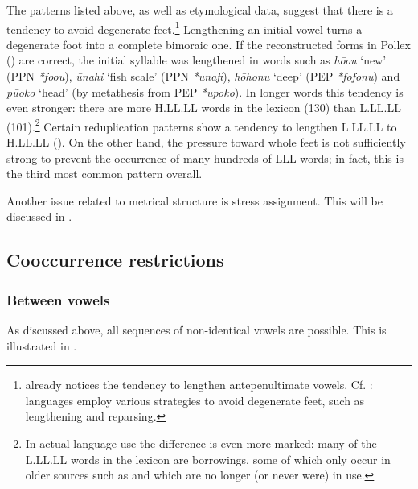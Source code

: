 The patterns listed above, as well as etymological data, suggest that there is a tendency to avoid degenerate feet.\footnote{\label{fn:51}\citet[17]{Englert1978} already notices the tendency to lengthen antepenultimate vowels. Cf. \citet[399]{Kager1995}: languages employ various strategies to avoid degenerate feet, such as lengthening and reparsing.} Lengthening an initial vowel turns a degenerate foot into a complete bimoraic one. If the reconstructed forms in Pollex (\citealt{GreenhillClark2011}) are correct, the initial syllable was lengthened in words such as \textit{\mbox{hō{\ꞌ}ou}} ‘new’ (PPN \textit{\mbox{*fo{\ꞌ}ou}}), \textit{{\ꞌ}ūnahi} ‘fish scale’ (PPN \textit{*{\ꞌ}unafi}), \textit{hōhonu} ‘deep’ (PEP \textit{*fofonu}) and \textit{pū{\ꞌ}oko} ‘head’ (by metathesis from PEP \textit{*upoko}). In longer words this tendency is even stronger: there are more H.LL.LL words in the lexicon (130) than L.LL.LL (101).\footnote{\label{fn:52}In actual language use the difference is even more marked: many of the L.LL.LL words in the lexicon are borrowings, some of which only occur in older sources such as \citet{Roussel1908} and which are no longer (or never were) in use.} Certain reduplication patterns show a tendency to lengthen L.LL.LL to H.LL.LL (). On the other hand, the pressure toward whole feet is not sufficiently strong to prevent the occurrence of many hundreds of LLL words; in fact, this is the third most common pattern overall.

Another issue related to metrical structure is stress assignment. This will be discussed in .

\largerpage
\subsection{Cooccurrence restrictions}\label{sec:2.3.3}
\subsubsection{Between vowels}\label{sec:2.3.3.1}
As discussed above, all sequences of non-identical vowels are possible. This is illustrated in .

